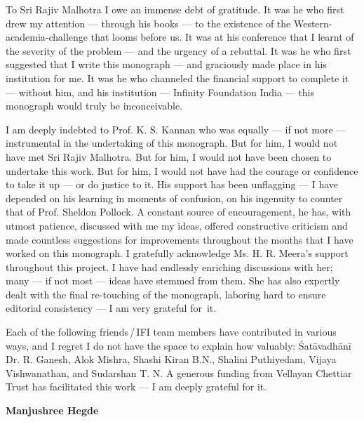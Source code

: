 To Sri Rajiv Malhotra I owe an immense debt of gratitude. It was he who first drew my attention --- through his books --- to the existence of the Western-academia-challenge that looms before us. It was at his conference that I learnt of the severity of the problem --- and the urgency of a rebuttal. It was he who first suggested that I write this monograph --- and graciously made place in his institution for me. It was he who channeled the financial support to complete it --- without him, and his institution --- Infinity Foundation India --- this monograph would truly be inconceivable.   

I am deeply indebted to Prof. K. S. Kannan who was equally --- if not more --- instrumental in the undertaking of this monograph. But for him, I would not have met Sri Rajiv Malhotra. But for him, I would not have been chosen to undertake this work. But for him, I would not have had the courage or confidence to take it up --- or do justice to it. His support has been unflagging --- I have depended on his learning in moments of confusion, on his ingenuity to counter that of Prof. Sheldon Pollock. A constant source of encouragement, he has, with utmost patience, discussed with me my ideas, offered constructive criticism and made countless suggestions for improvements throughout the months that I have worked on this monograph.  I gratefully acknowledge Ms. H. R. Meera’s support throughout this project. I have had endlessly enriching discussions with her; many --- if not most --- ideas have stemmed from them.  She has also expertly dealt with the final re-touching of the monograph, laboring hard to ensure editorial consistency --- I am very grateful for~it. 

Each of the following friends\,/\,IFI team members have contributed in various ways, and I regret I do not have the space to explain how valuably: Śatāvadhānī Dr. R. Ganesh, Alok Mishra, Shashi Kiran B.N., Shalini Puthiyedam, Vijaya Vishwanathan, and Sudarshan T. N. A generous funding from Vellayan Chettiar Trust has facilitated this work --- I am deeply grateful for it. 


\bigskip
\hfill {\bf Manjushree Hegde}
